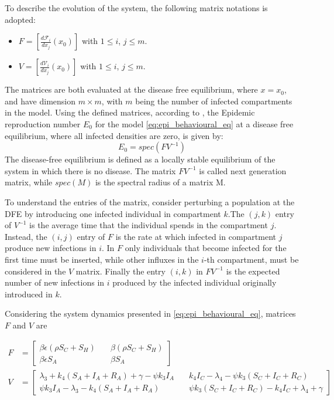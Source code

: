 To describe the evolution of the system, the following matrix notations is adopted: 
\begin{itemize}
	\item $F = [\frac{d \mathcal{F}_i}{d x_j}(x_0)]$ with $1 \le i$, $j \le m$.
	\item $V = [\frac{d \mathcal{V}_i}{d x_j}(x_0)]$ with $1 \le i$, $j \le m$.	
\end{itemize} 
The matrices are both evaluated at the disease free equilibrium, where $x = x_0$, and have dimension $m \times m$, with $m$ being the number of infected compartments in the model. 
Using the defined matrices, according to \cite{van_den_Driessche_2002,van_den_Driessche_2017}, the Epidemic reproduction number $E_0$ for the model \eqref{eq:epi_behavioural_eq} at a disease free equilibrium, where all infected densities are zero, is given by:
\begin{equation}
E_0 = spec(FV^{-1})
\label{eq:R_0_eqn}
\end{equation}
The disease-free equilibrium is defined as a locally stable equilibrium of the system in which there is no disease.
The matrix $FV^{-1}$ is called next generation matrix, while $spec(M)$ is the spectral radius of a matrix M.

To understand the entries of the matrix, consider perturbing a population at the DFE by introducing one infected individual in compartment $k$.The $(j,k)$ entry of $V^{-1}$ is the average time that the individual spends in the compartment $j$. Instead, the $(i,j)$ entry of $F$ is the  rate at which infected in compartment $j$ produce new infections in $i$. In $F$ only individuals that become infected for the first time must be inserted, while other influxes in the $i$-th compartment, must be considered in the $V$ matrix. Finally the entry $(i,k)$  in $FV^{-1}$ is the expected number of new infections in  $i$ produced by the infected individual originally introduced in $k$.

Considering the system dynamics presented in \eqref{eq:epi_behavioural_eq}, matrices $F$ and $V$ are

\begin{align}
F & = 
\begin{bmatrix}
	\beta \epsilon(\rho S_C + S_H) \quad & \beta(\rho S_C + S_H) \\
	\beta \epsilon S_A \quad& \beta S_A
\end{bmatrix} \\
V & = 
\begin{bmatrix}
	\lambda_3+k_4(S_A+I_A+R_A)+\gamma-\psi k_3 I_A \quad & k_4 I_C-\lambda_4-\psi k_3 (S_C+I_C + R_C)  \\
	\psi k_3 I_A - \lambda_3 - k_4 (S_A + I_A + R_A) \quad & \psi k_3 (S_C + I_C + R_C) - k_4 I_C + \lambda_4 + \gamma
\end{bmatrix}
\label{eq:next_gen_matrices}
\end{align}

